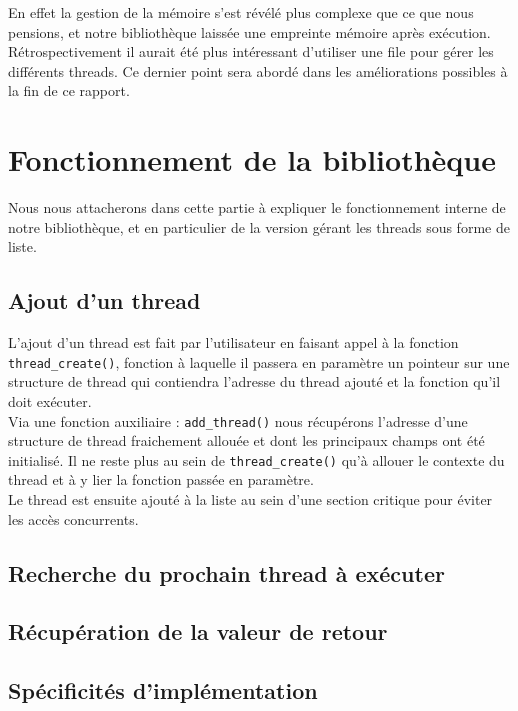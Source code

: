 \documentclass{article}
\begin{document}
			En effet la gestion de la mémoire s'est révélé plus
            complexe que ce que nous pensions, et notre bibliothèque
            laissée une empreinte mémoire après exécution.
            Rétrospectivement il aurait été plus intéressant
            d'utiliser une file pour gérer les différents threads. Ce
            dernier point sera abordé dans les améliorations possibles
            à la fin de ce rapport.
			

	\section{Fonctionnement de la bibliothèque}
	Nous nous attacherons dans cette partie à expliquer le
    fonctionnement interne de notre bibliothèque, et en particulier
     de la version gérant les threads sous forme de
    liste.

		\subsection{Ajout d'un thread}
		L'ajout d'un thread est fait par l'utilisateur en faisant 
		appel à la fonction \verb!thread_create()!, fonction à laquelle il
		passera en paramètre un pointeur sur une structure de thread qui 
		contiendra l'adresse du thread ajouté et la fonction qu'il doit
		exécuter.\\
		
		Via une fonction auxiliaire : \verb!add_thread()! nous récupérons
		l'adresse d'une structure de thread fraichement allouée et dont les
		principaux champs ont été initialisé. Il ne reste plus au sein de 
		\verb!thread_create()! qu'à allouer le contexte du thread et à y lier
		la fonction passée en paramètre.\\
		
		Le thread est ensuite ajouté à la liste au sein d'une section critique
		pour éviter les accès concurrents.

		\subsection{Recherche du prochain thread à exécuter}
		
		\subsection{Récupération de la valeur de retour}

		\subsection{Spécificités d'implémentation}
		
\end{document}
